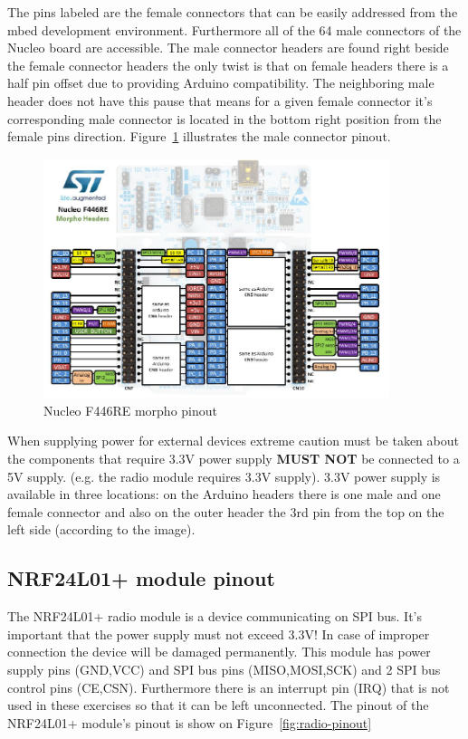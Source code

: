 \documentclass[a4paper]{article}
\begin{document}
The pins labeled are the female connectors that can be easily addressed from the mbed development environment.
Furthermore all of the 64 male connectors of the Nucleo board are accessible. The male connector headers are found right
beside the female connector headers the only twist is that on female headers there is a half pin offset due
to providing Arduino compatibility. The neighboring male header does not have this pause that means for a given female
connector it's corresponding male connector is located in the bottom right position from the female pins direction.
Figure~\ref{fig:nucleo-pinout-morpho} illustrates the male connector pinout.

\begin{figure}[H]
    \centering
    \includegraphics[width=0.9\textwidth]{figures/nucleo-morpho-pinout.png}
    \caption{Nucleo F446RE morpho pinout}
    \label{fig:nucleo-pinout-morpho}
\end{figure}

When supplying power for external devices extreme caution must be taken about the components that require 3.3V power
supply \textbf{MUST NOT} be connected to a 5V supply. (e.g. the radio module requires 3.3V supply).
3.3V power supply is available in three locations: on the Arduino headers there is one male and one female connector
and also on the outer header the 3rd pin from the top on the left side (according to the image).

\subsection{NRF24L01+ module pinout}

The NRF24L01+ radio module is a device communicating on SPI bus. It's important that the power supply must not exceed
3.3V!
In case of improper connection the device will be damaged permanently.
This module has power supply pins (GND,VCC) and SPI bus pins (MISO,MOSI,SCK) and 2 SPI bus control pins (CE,CSN).
Furthermore there is an interrupt pin (IRQ) that is not used in these exercises so that it can be left unconnected.
The pinout of the NRF24L01+ module's pinout is show on Figure~\ref{fig:radio-pinout}
\end{document}
